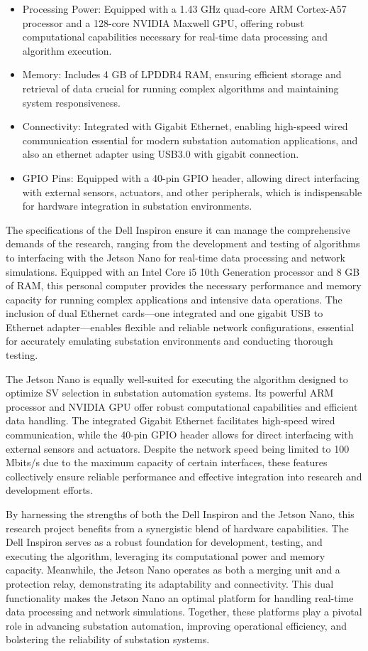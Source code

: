 \begin{itemize}
	\item Processing Power: Equipped with a 1.43 GHz quad-core ARM Cortex-A57 processor and a 128-core NVIDIA Maxwell GPU, offering robust computational capabilities necessary for real-time data processing and algorithm execution.
	\item Memory: Includes 4 GB of LPDDR4 RAM, ensuring efficient storage and retrieval of data crucial for running complex algorithms and maintaining system responsiveness.
	\item Connectivity: Integrated with Gigabit Ethernet, enabling high-speed wired communication essential for modern substation automation applications, and also an ethernet adapter using USB3.0 with gigabit connection.
	\item GPIO Pins: Equipped with a 40-pin GPIO header, allowing direct interfacing with external sensors, actuators, and other peripherals, which is indispensable for hardware integration in substation environments.
\end{itemize}

The specifications of the Dell Inspiron ensure it can manage the comprehensive demands of the research, ranging from the development and testing of algorithms to interfacing with the Jetson Nano for real-time data processing and network simulations. Equipped with an Intel Core i5 10th Generation processor and 8 GB of RAM, this personal computer provides the necessary performance and memory capacity for running complex applications and intensive data operations. The inclusion of dual Ethernet cards—one integrated and one gigabit USB to Ethernet adapter—enables flexible and reliable network configurations, essential for accurately emulating substation environments and conducting thorough testing.

The Jetson Nano is equally well-suited for executing the algorithm designed to optimize SV selection in substation automation systems. Its powerful ARM processor and NVIDIA GPU offer robust computational capabilities and efficient data handling. The integrated Gigabit Ethernet facilitates high-speed wired communication, while the 40-pin GPIO header allows for direct interfacing with external sensors and actuators. Despite the network speed being limited to 100 Mbits/s due to the maximum capacity of certain interfaces, these features collectively ensure reliable performance and effective integration into research and development efforts.

By harnessing the strengths of both the Dell Inspiron and the Jetson Nano, this research project benefits from a synergistic blend of hardware capabilities. The Dell Inspiron serves as a robust foundation for development, testing, and executing the algorithm, leveraging its computational power and memory capacity. Meanwhile, the Jetson Nano operates as both a merging unit and a protection relay, demonstrating its adaptability and connectivity. This dual functionality makes the Jetson Nano an optimal platform for handling real-time data processing and network simulations. Together, these platforms play a pivotal role in advancing substation automation, improving operational efficiency, and bolstering the reliability of substation systems.


